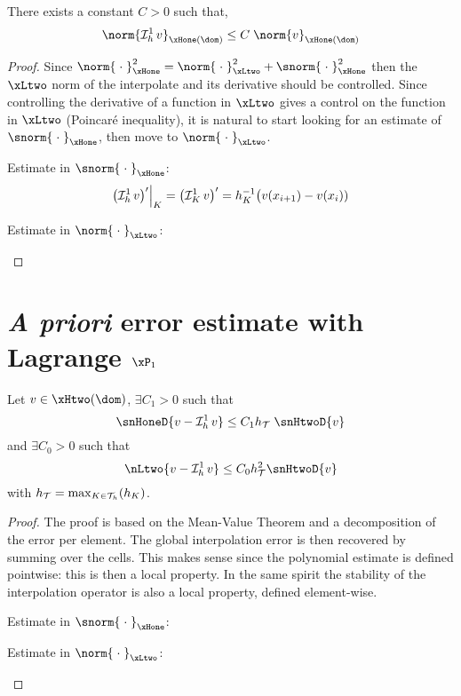 \begin{prpstn}
There exists a constant $C>0$ such that,
\begin{equation}\label{eq:stability_lagrange_p1}
\norm{\Lgrh{1} v}_{\xHone(\dom)} \leq C\; \norm{v}_{\xHone(\dom)}
\end{equation}
\end{prpstn}
\begin{proof}
Since $\norm{\;\cdot\;}^2_{\xHone} = \norm{\;\cdot\;}^2_{\xLtwo} + \snorm{\;\cdot\;}^2_{\xHone}$ then the $\xLtwo$ norm of the interpolate and its derivative should be controlled. Since controlling the derivative of a function in $\xLtwo$ gives a control on the function in $\xLtwo$ (Poincaré inequality), it is natural to start looking for an estimate of $\snorm{\;\cdot\;}_{\xHone}$, then move to $\norm{\;\cdot\;}_{\xLtwo}$.
\begin{tmaproofitems}
\item Estimate in $\snorm{\;\cdot\;}_{\xHone}$:
\[
\Restrict{\bigl(\Lgrh{1}v\bigr)'}{K} = \bigl(\LgrK{1}v\bigr)' = h_K^{-1}\bigl(v(x_{i+1})- v(x_{i}))
\]



\item Estimate in $\norm{\;\cdot\;}_{\xLtwo}$:
\end{tmaproofitems}
\end{proof}

\section{\textit{A priori} error estimate with Lagrange $\xPone$}

\begin{thrm}
Let $v \in \xHtwo(\dom)$, $\exists C_1 > 0$ such that
\begin{equation}
\snHoneD{v - \Lgrh{1}v}  \leq C_1 \sizeT\;\snHtwoD{v}
\end{equation}
and $\exists C_0 > 0$ such that
\begin{equation}
\nLtwo{v - \Lgrh{1}v}  \leq C_0 \sizeT^2 \snHtwoD{v}
\end{equation}
with $h_{\mathcal T} = \max_{K\in{\mathcal T}_h}(h_K)$.
\end{thrm}
\begin{proof}
The proof is based on the Mean-Value Theorem and a decomposition of the error per element.
The global interpolation error is then recovered by summing over the cells.
This makes sense since the polynomial estimate is defined pointwise: this is then a local property.
In the same spirit the stability of the interpolation operator is also a local property, defined element-wise.

\medskip
\begin{tmaproofitems}
\item Estimate in $\snorm{\;\cdot\;}_{\xHone}$:
\item Estimate in $\norm{\;\cdot\;}_{\xLtwo}$:
\end{tmaproofitems}

\end{proof}

